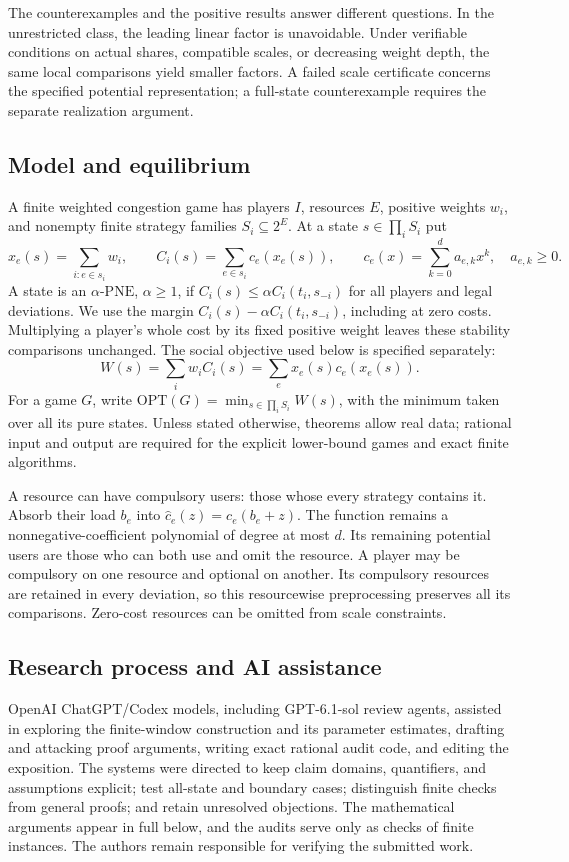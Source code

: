\documentclass[manuscript,review,anonymous]{acmart}
\newcommand{\PNE}{\mathrm{PNE}}
\newcommand{\OPT}{\mathrm{OPT}}
\begin{document}
The counterexamples and the positive results answer different questions. In the unrestricted class, the leading linear factor is unavoidable. Under verifiable conditions on actual shares, compatible scales, or decreasing weight depth, the same local comparisons yield smaller factors. A failed scale certificate concerns the specified potential representation; a full-state counterexample requires the separate realization argument.

\subsection{Model and equilibrium}\label{sec:model}
A finite weighted congestion game has players $I$, resources $E$, positive weights $w_i$, and nonempty finite strategy families $S_i\subseteq2^E$. At a state $s\in\prod_iS_i$ put
\[
 x_e(s)=\sum_{i:e\in s_i}w_i,\qquad
 C_i(s)=\sum_{e\in s_i}c_e(x_e(s)),\qquad
 c_e(x)=\sum_{k=0}^d a_{e,k}x^k,\quad a_{e,k}\ge0.
\]
A state is an $\alpha$-$\PNE$, $\alpha\ge1$, if $C_i(s)\le\alpha C_i(t_i,s_{-i})$ for all players and legal deviations. We use the margin $C_i(s)-\alpha C_i(t_i,s_{-i})$, including at zero costs. Multiplying a player's whole cost by its fixed positive weight leaves these stability comparisons unchanged. The social objective used below is specified separately:
\begin{equation}\label{eq:welfare}
 W(s)=\sum_iw_iC_i(s)=\sum_ex_e(s)c_e(x_e(s)).
\end{equation}
For a game $G$, write $\OPT(G)=\min_{s\in\prod_iS_i}W(s)$, with the minimum taken over all its pure states.
Unless stated otherwise, theorems allow real data; rational input and output are required for the explicit lower-bound games and exact finite algorithms.

A resource can have compulsory users: those whose every strategy contains it. Absorb their load $b_e$ into $\widehat c_e(z)=c_e(b_e+z)$. The function remains a nonnegative-coefficient polynomial of degree at most $d$. Its remaining potential users are those who can both use and omit the resource. A player may be compulsory on one resource and optional on another. Its compulsory resources are retained in every deviation, so this resourcewise preprocessing preserves all its comparisons. Zero-cost resources can be omitted from scale constraints.

\subsection{Research process and AI assistance}
OpenAI ChatGPT/Codex models, including GPT-6.1-sol review agents, assisted in exploring the finite-window construction and its parameter estimates, drafting and attacking proof arguments, writing exact rational audit code, and editing the exposition. The systems were directed to keep claim domains, quantifiers, and assumptions explicit; test all-state and boundary cases; distinguish finite checks from general proofs; and retain unresolved objections. The mathematical arguments appear in full below, and the audits serve only as checks of finite instances. The authors remain responsible for verifying the submitted work.
\end{document}
